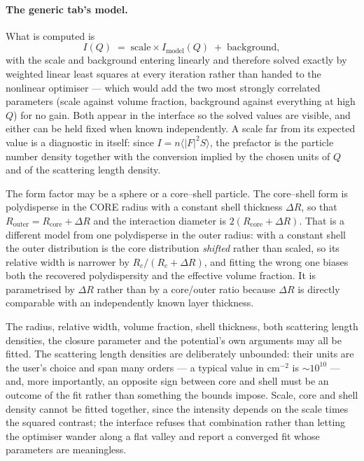 \documentclass[11pt,a4paper]{article}
\begin{document}
\paragraph{The generic tab's model.} What is computed is
\begin{equation}
  I(Q) \;=\; \mathrm{scale}\times I_{\mathrm{model}}(Q) \;+\;
  \mathrm{background},
\end{equation}
with the scale and background entering linearly and therefore solved exactly
by weighted linear least squares at every iteration rather than handed to the
nonlinear optimiser --- which would add the two most strongly correlated
parameters (scale against volume fraction, background against everything at
high $Q$) for no gain. Both appear in the interface so the solved values are
visible, and either can be held fixed when known independently. A scale far
from its expected value is a diagnostic in itself: since
$I = n\langle|F|^2 S\rangle$, the prefactor is the particle number density
together with the conversion implied by the chosen units of $Q$ and of the
scattering length density.

The form factor may be a sphere or a core--shell particle. The core--shell
form is polydisperse in the CORE radius with a constant shell thickness
$\Delta R$, so that $R_{\mathrm{outer}} = R_{\mathrm{core}} + \Delta R$ and the
interaction diameter is $2(R_{\mathrm{core}} + \Delta R)$. That is a different
model from one polydisperse in the outer radius: with a constant shell the
outer distribution is the core distribution \emph{shifted} rather than scaled,
so its relative width is narrower by $R_c/(R_c+\Delta R)$, and fitting the
wrong one biases both the recovered polydispersity and the effective volume
fraction. It is parametrised by $\Delta R$ rather than by a core/outer ratio
because $\Delta R$ is directly comparable with an independently known layer
thickness.

The radius, relative width, volume fraction, shell thickness, both scattering
length densities, the closure parameter and the potential's own arguments may
all be fitted. The scattering length densities are deliberately unbounded:
their units are the user's choice and span many orders --- a typical value in
$\mathrm{cm}^{-2}$ is $\sim10^{10}$ --- and, more importantly, an opposite sign
between core and shell must be an outcome of the fit rather than something the
bounds impose. Scale, core and shell density cannot be fitted together, since
the intensity depends on the scale times the squared contrast; the interface
refuses that combination rather than letting the optimiser wander along a flat
valley and report a converged fit whose parameters are meaningless.
\end{document}
